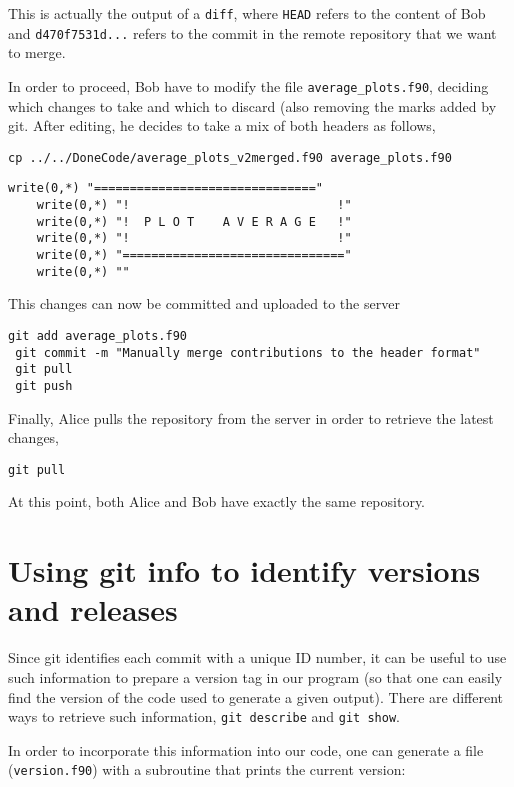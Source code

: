 \documentclass[a4paper,10pt]{article}
\begin{document}
This is actually the output of a \texttt{diff}, where \texttt{HEAD} refers to the content of Bob and \texttt{d470f7531d...} refers to the commit in the remote repository that we want to merge.

In order to proceed, Bob have to modify the file \texttt{average\_plots.f90}, deciding which changes to take and which to discard (also removing the marks added by git. After editing, he decides to take a mix of both headers as follows,

\begin{lstlisting}[style=AliceFake]
 cp ../../DoneCode/average_plots_v2merged.f90 average_plots.f90
\end{lstlisting}
\begin{lstlisting}[style=Text]
    write(0,*) "==============================="
    write(0,*) "!                             !"
    write(0,*) "!  P L O T    A V E R A G E   !"
    write(0,*) "!                             !"
    write(0,*) "==============================="
    write(0,*) ""
\end{lstlisting}

This changes can now be committed and uploaded to the server

\begin{lstlisting}[style=Bob]
 git add average_plots.f90
 git commit -m "Manually merge contributions to the header format"
 git pull
 git push
\end{lstlisting}

Finally, Alice pulls the repository from the server in order to retrieve the latest changes,

\begin{lstlisting}[style=Alice]
 git pull
\end{lstlisting}

At this point, both Alice and Bob have exactly the same repository.

\clearpage

\section{Using git info to identify versions and releases}
Since git identifies each commit with a unique ID number, it can be useful to use such information to prepare a version tag in our program (so that one can easily find the version of the code used to generate a given output). There are different ways to retrieve such information, \texttt{git describe} and \texttt{git show}.

In order to incorporate this information into our code, one can generate a file (\texttt{version.f90}) with a subroutine that prints the current version:
\end{document}

